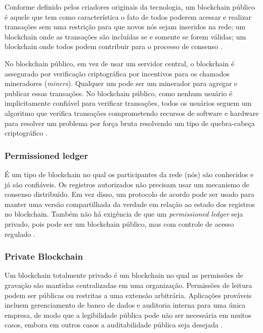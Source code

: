     Conforme definido pelos criadores originais da tecnologia, um blockchain público é aquele que tem como característica o fato de todos poderem acessar e realizar transações sem uma restrição para que novos nós sejam inseridos na rede; um blockchain onde as transações são incluídas se e somente se forem válidas; um blockchain onde todos podem contribuir para o processo de consenso \cite{blockchain_pratical_guide}.
    
    No blockchain público, em vez de usar um servidor central, o blockchain é assegurado por verificação criptográfica por incentivos para os chamados mineradores (\textit{miners}). Qualquer um pode ser um minerador para agregar e publicar essas transações. No blockchain público, como nenhum usuário é implicitamente confiável para verificar transações, todos os usuários seguem um algoritmo que verifica transações comprometendo recursos de software e hardware para resolver um problema por força bruta resolvendo um tipo de quebra-cabeça criptográfico  \cite{blockchain_pratical_guide}.
    

    \subsubsection{Permissioned ledger}
    
    É um tipo de blockchain no qual os participantes da rede (nós) são conhecidos e já são confiáveis. Os registros autorizados não precisam usar um mecanismo de consenso distribuído. Em vez disso, um protocolo de acordo pode ser usado para manter uma versão compartilhada da verdade em relação ao estado dos registros no blockchain. Também não há exigência de que um \textit{permissioned ledger} seja privado, pois pode ser um blockchain público, mas com controle de acesso regulado \cite{mastering_blockchain}.

    \subsubsection{Private Blockchain}

    Um blockchain totalmente privado é um blockchain no qual as permissões de gravação são mantidas centralizadas em uma organização. Permissões de leitura podem ser públicas ou restritas a uma extensão arbitrária. Aplicações prováveis incluem gerenciamento de banco de dados e auditoria interna para uma única empresa, de modo que a legibilidade pública pode não ser necessária em muitos casos, embora em outros casos a auditabilidade pública seja desejada  \cite{blockchain_pratical_guide}.



